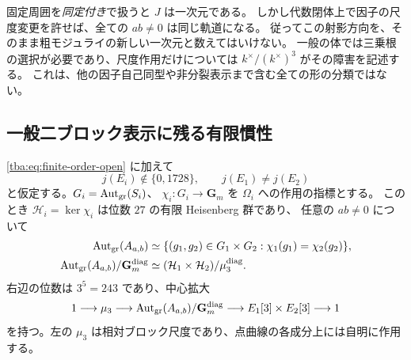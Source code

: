 \begin{remark}
固定周囲を\emph{同定付き}で扱うと $J$ は一次元である。
しかし代数閉体上で因子の尺度変更を許せば、全ての $ab\ne0$ は同じ軌道になる。
従ってこの射影方向を、そのまま粗モジュライの新しい一次元と数えてはいけない。
一般の体では三乗根の選択が必要であり、尺度作用だけについては
$k^\times/(k^\times)^3$ がその障害を記述する。
これは、他の因子自己同型や非分裂表示まで含む全ての形の分類ではない。
\end{remark}

\subsection{一般二ブロック表示に残る有限慣性}

\begin{theorem}[一般の次数付き慣性の位数 $243$]
\label{tba:thm:generic-inertia}
\eqref{tba:eq:finite-order-open} に加えて
\begin{equation}\label{tba:eq:generic-j}
 j(E_i)\notin\{0,1728\},\qquad j(E_1)\ne j(E_2)
\end{equation}
と仮定する。$G_i=\operatorname{Aut}_{\mathrm{gr}}(S_i)$、
$\chi_i:G_i\to\mathbf G_m$ を $\Omega_i$ への作用の指標とする。
このとき $\mathcal H_i=\ker\chi_i$ は位数 $27$ の有限 Heisenberg 群であり、
任意の $ab\ne0$ について
\begin{align}
 \operatorname{Aut}_{\mathrm{gr}}(A_{a,b})
  &\simeq\{(g_1,g_2)\in G_1\times G_2:
                         \chi_1(g_1)=\chi_2(g_2)\},
 \label{tba:eq:aut-fiber-product}\\
 \operatorname{Aut}_{\mathrm{gr}}(A_{a,b})/\mathbf G_m^{\mathrm{diag}}
  &\simeq(\mathcal H_1\times\mathcal H_2)/\mu_3^{\mathrm{diag}}.
 \label{tba:eq:generic-aut-group}
\end{align}
右辺の位数は $3^5=243$ であり、中心拡大
\begin{equation}\label{tba:eq:generic-aut-extension}
 1\longrightarrow\mu_3\longrightarrow
 \operatorname{Aut}_{\mathrm{gr}}(A_{a,b})/\mathbf G_m^{\mathrm{diag}}
 \longrightarrow E_1[3]\times E_2[3]\longrightarrow1
\end{equation}
を持つ。左の $\mu_3$ は相対ブロック尺度であり、点曲線の各成分上には自明に作用する。
\end{theorem}
